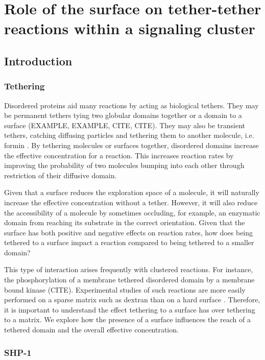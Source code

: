 \documentclass[../../AdvancementSummary.tex]{subfiles}
\begin{document}
\section{Role of the surface on tether-tether reactions within a signaling cluster}

\subsection{Introduction}
\subsubsection{Tethering}

Disordered proteins aid many reactions by acting as biological tethers. They may be permanent tethers tying two globular domains together or a domain to a surface (EXAMPLE, EXAMPLE, CITE, CITE). They may also be transient tethers, catching diffusing particles and tethering them to another molecule, i.e. formin \cite{Vavylonis2006, Bryant2017}. By tethering molecules or surfaces together, disordered domains increase the effective concentration for a reaction. This increases reaction rates by improving the probability of two molecules bumping into each other through restriction of their diffusive domain.

Given that a surface reduces the exploration space of a molecule, it will naturally increase the effective concentration without a tether. However, it will also reduce the accessibility of a molecule by sometimes occluding, for example, an enzymatic domain from reaching its substrate in the correct orientation. Given that the surface has both positive and negative effects on reaction rates, how does being tethered to a surface impact a reaction compared to being tethered to a smaller domain? 

This type of interaction arises frequently with clustered reactions. For instance, the phosphorylation of a membrane tethered disordered domain by a membrane bound kinase (CITE). Experimental studies of such reactions are more easily performed on a sparse matrix such as dextran than on a hard surface \cite{Goyette2017}. Therefore, it is important to understand the effect tethering to a surface has over tethering to a matrix. We explore how the presence of a surface influences the reach of a tethered domain and the overall effective concentration.

\subsubsection{SHP-1}
\end{document}
